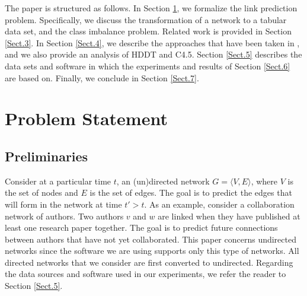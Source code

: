 \documentclass{acm_proc_article-sp}
\begin{document}

The paper is structured as follows. In Section \ref{Sect.2}, we formalize the link prediction problem. Specifically, we discuss the transformation of a network to a tabular data set, and the class imbalance problem. Related work is provided in Section \ref{Sect.3}. In Section \ref{Sect.4}, we describe the approaches that have been taken in \cite{Hasan06linkprediction, Lichtenwalter:2010:NPM:1835804.1835837}, and we also provide an analysis of HDDT and C4.5. Section \ref{Sect.5} describes the data sets and software in which the experiments and results of Section \ref{Sect.6} are based on. Finally, we conclude in Section \ref{Sect.7}.  


\section{Problem Statement} 
\label{Sect.2}

\subsection{Preliminaries}

Consider at a particular time $t$, an (un)directed network $G = \langle V,E \rangle$, where $V$ is the set of nodes and $E$ is the set of edges. The goal is to predict the edges that will form in the network at time $t' > t$. As an example, consider a collaboration network of authors. Two authors $v$ and $w$ are linked when they have published at least one research paper together. The goal is to predict future connections between authors that have not yet collaborated. This paper concerns undirected networks since the software we are using supports only this type of networks. All directed networks that we consider are first converted to undirected. Regarding the data sources and software used in our experiments, we refer the reader to Section \ref{Sect.5}.  
\end{document}

